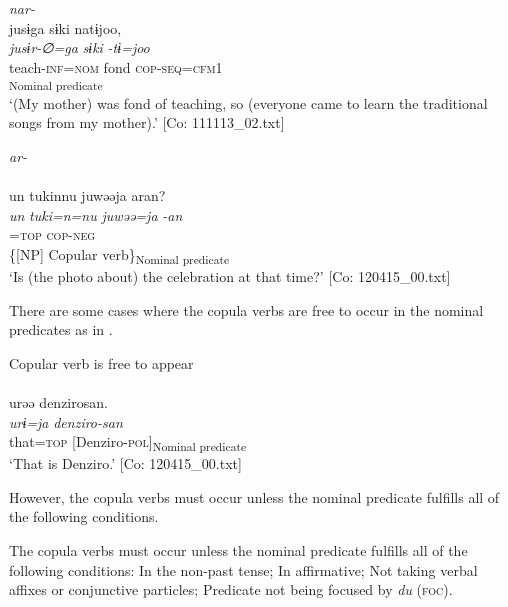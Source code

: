 \ex  \textit{nar-}\\
\gllll   jusɨga  sɨki  natɨjoo,\\
      \textit{jusɨr-∅=ga}  \textit{sɨki}  \textit{-tɨ=joo}\\
      teach-\textsc{inf}=\textsc{nom}  fond  \textsc{cop}-\textsc{seq}=\textsc{cfm}1\\
        [NP  Copular verb]\textsubscript{Nominal predicate}\\
      \glt       ‘(My mother) was fond of teaching, so (everyone came to learn the traditional songs from my mother).’ [Co: 111113\_02.txt]

\ex  \textit{ar-}\\\\
\gllll     un  tukinnu  juwəəja  aran?\\
      \textit{un}  \textit{tuki=n=nu}  \textit{juwəə=ja}  \textit{-an}\\
      [that  time=\textsc{dat}1=\textsc{gen}  celebration]=\textsc{top}  \textsc{cop}-\textsc{neg}\\
      \{[NP]  Copular verb\}\textsubscript{Nominal predicate}\\
      \glt       ‘Is (the photo about) the celebration at that time?’ [Co: 120415\_00.txt]
    \z
\z

There are some cases where the copula verbs are free to occur in the nominal predicates as in .

\ea  Copular verb is free to appear \label{ex:4.14}\\\\
\glll    urəə  denzirosan.\\
    \textit{urɨ=ja}  \textit{denziro-san}\\
    that=\textsc{top}  [Denziro-\textsc{pol}]\textsubscript{Nominal predicate}\\
    \glt     ‘That is Denziro.’ [Co: 120415\_00.txt]
\z

However, the copula verbs must occur unless the nominal predicate fulfills all of the following conditions.

\ea  The copula verbs must occur unless the nominal predicate fulfills all of the following conditions: \label{ex:4.15}
  \ea  In the non-past tense;
  \ex  In affirmative;
  \ex  Not taking verbal affixes or conjunctive particles;
  \ex  Predicate not being focused by \textit{du} (\textsc{foc}).
  \z
\z

